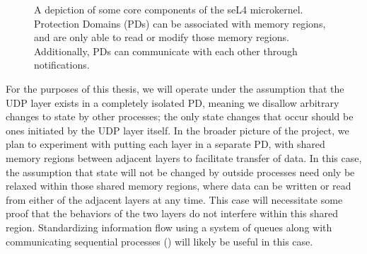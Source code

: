 \documentclass[twoside]{memoir}
\begin{document}
\begin{figure}[h]
    \centering
    \caption{A depiction of some core components of the seL4 microkernel.
    Protection Domains (PDs) can be associated with memory regions,
    and are only able to read or modify those memory regions.
    Additionally, PDs can communicate with each other through notifications.}
    \label{fig:sel4-mem-pd}
\end{figure}

For the purposes of this thesis, we will operate under the assumption that
the UDP layer exists in a completely isolated PD, meaning
we disallow arbitrary changes to state by other processes;
the only state changes that occur should be ones initiated by the UDP
layer itself.
In the broader picture of the project, we plan to experiment with putting
each layer in a separate PD,
with shared memory regions between adjacent layers to facilitate transfer of data.
In this case, the assumption that state will not be changed by outside processes
need only be relaxed within those shared memory regions, where
data can be written or read from either of the adjacent layers at any time.
This case will necessitate some proof that the behaviors of the two layers
do not interfere within this shared region.
Standardizing information flow using a system of queues along with 
communicating sequential processes (\cite{csp})
will likely be useful in this case.
\end{document}
